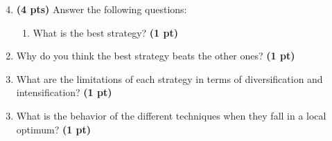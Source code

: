 \documentclass[11pt,a4paper]{report}
\begin{document}
\begin{enumerate}
\setcounter{enumi}{3}
    \item \textbf{(4 pts)} Answer the following questions:
    \begin{enumerate}
        \item What is the best strategy? \textbf{(1 pt)}
    \end{enumerate}
\end{enumerate}

\begin{answers}[1.5cm]
\end{answers}


\newpage
\begin{enumerate}
\setcounter{enumi}{3}
\begin{enumerate}
\setcounter{enumii}{1}
    \item Why do you think the best strategy beats the other ones? \textbf{(1 pt)}
\end{enumerate}
\end{enumerate}

\begin{answers}[2.5cm]
\end{answers}



\begin{enumerate}
\setcounter{enumi}{3}
\begin{enumerate}
\setcounter{enumii}{2}
    \item What are the limitations of each strategy in terms of diversification 
    and intensification? \textbf{(1 pt)}
\end{enumerate}
\end{enumerate}

\begin{answer}
\end{answer}



\begin{enumerate}
\setcounter{enumi}{3}
\begin{enumerate}
\setcounter{enumii}{2}
    \item What is the behavior of the different techniques when they fall 
    in a local optimum? \textbf{(1 pt)}
\end{enumerate}
\end{enumerate}

\begin{answer}
\end{answer}
\end{document}

